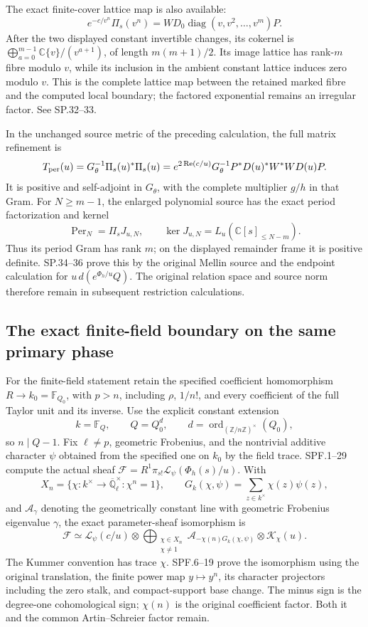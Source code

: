 The exact finite-cover lattice map is also available:
\[
 e^{-c/v^n}\Pi_s(v^n)
    =WD_0\operatorname{diag}(v,v^2,\ldots,v^m)P .
\]
After the two displayed constant invertible changes, its cokernel is
\(\bigoplus_{a=0}^{m-1}\mathbb C\{v\}/(v^{a+1})\), of length
\(m(m+1)/2\).  Its image lattice has rank-\(m\) fibre modulo \(v\),
while its inclusion in the ambient constant lattice induces zero
modulo \(v\).  This is the complete lattice map between the retained
marked fibre and the computed local boundary; the factored
exponential remains an irregular factor.  See SP.32--33.

In the unchanged source metric of the preceding calculation, the
full matrix refinement is
\[
 T_{\rm per}(u)
 =G_\theta^{-1}\Pi_s(u)^*\Pi_s(u)
 =e^{2\operatorname{Re}(c/u)}
   G_\theta^{-1}P^*D(u)^*W^*WD(u)P .
\]
It is positive and self-adjoint in \(G_\theta\), with the complete
multiplier \(g/h\) in that Gram.  For \(N\geq m-1\), the enlarged
polynomial source has the exact period factorization and kernel
\[
 \operatorname{Per}_N=\Pi_sJ_{u,N},\qquad
 \ker J_{u,N}=L_u(\mathbb C[s]_{\leq N-m}).
\]
Thus its period Gram has rank \(m\); on the displayed remainder
frame it is positive definite.  SP.34--36 prove this by the original
Mellin source and the endpoint calculation for
\(u\,d(e^{\Phi_h/u}Q)\).  The original relation space and source norm
therefore remain in subsequent restriction calculations.

\subsection{The exact finite-field boundary on the same primary phase}

For the finite-field statement retain the specified coefficient
homomorphism \(R\to k_0=\mathbb F_{Q_0}\), with \(p>n\),
including \(\rho\), \(1/n!\), and every coefficient of the full
Taylor unit and its inverse.  Use the explicit constant extension
\[
 k=\mathbb F_Q,\qquad Q=Q_0^d,\qquad
 d=\operatorname{ord}_{(\mathbb Z/n\mathbb Z)^\times}(Q_0),
\]
so \(n\mid Q-1\).  Fix \(\ell\ne p\), geometric Frobenius, and the
nontrivial additive character \(\psi\) obtained from the specified
one on \(k_0\) by the field trace.  SPF.1--29 compute the actual sheaf
\(\mathcal F=R^1\pi_{s!}\mathcal L_\psi(\Phi_h(s)/u)\).
With
\[
 X_n=\{\chi:k^\times\to\overline{\mathbb Q}_\ell^\times:
             \chi^n=1\},\qquad
 G_k(\chi,\psi)=\sum_{z\in k^\times}\chi(z)\psi(z),
\]
and \(\mathcal A_\gamma\) denoting the geometrically constant line
with geometric Frobenius eigenvalue \(\gamma\), the exact
parameter-sheaf isomorphism is
\[
 \mathcal F\simeq
 \mathcal L_\psi(c/u)\otimes
 \bigoplus_{\substack{\chi\in X_n\\\chi\ne1}}
   \mathcal A_{-\chi(n)G_k(\chi,\psi)}
                  \otimes\mathcal K_\chi(u).
\]
The Kummer convention has trace \(\chi\).  SPF.6--19 prove the
isomorphism using the original translation, the finite power map
\(y\mapsto y^n\), its character projectors including the zero stalk,
and compact-support base change.  The minus sign is the degree-one
cohomological sign; \(\chi(n)\) is the original coefficient factor.
Both it and the common Artin--Schreier factor remain.

